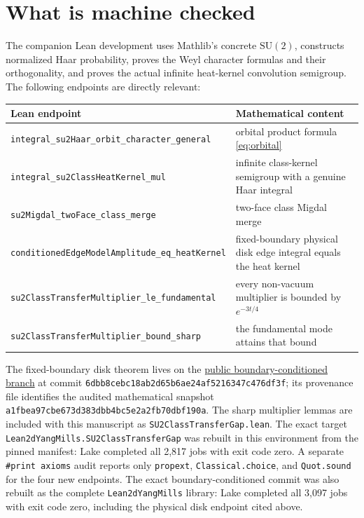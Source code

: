 \documentclass[11pt]{article}
\theoremstyle{remark}
\newcommand{\SU}{\mathrm{SU}(2)}
\begin{document}
\section{What is machine checked}

The companion Lean development uses Mathlib's concrete $\SU$, constructs
normalized Haar probability, proves the Weyl character formulas and their
orthogonality, and proves the actual infinite heat-kernel convolution
semigroup.  The following endpoints are directly relevant:
\begin{center}
\begin{tabular}{>{\raggedright\arraybackslash}p{}
                >{\raggedright\arraybackslash}p{}}
\toprule
Lean endpoint & Mathematical content\\
\midrule
\nolinkurl{integral_su2Haar_orbit_character_general}
  & orbital product formula \eqref{eq:orbital}\\
\nolinkurl{integral_su2ClassHeatKernel_mul}
  & infinite class-kernel semigroup with a genuine Haar integral\\
\nolinkurl{su2Migdal_twoFace_class_merge}
  & two-face class Migdal merge\\
\nolinkurl{conditionedEdgeModelAmplitude_eq_heatKernel}
  & fixed-boundary physical disk edge integral equals the heat kernel\\
\nolinkurl{su2ClassTransferMultiplier_le_fundamental}
  & every non-vacuum multiplier is bounded by $e^{-3t/4}$\\
\nolinkurl{su2ClassTransferMultiplier_bound_sharp}
  & the fundamental mode attains that bound\\
\bottomrule
\end{tabular}
\end{center}

The fixed-boundary disk theorem lives on the
\href{https://github.com/lluiseriksson/lean-2d-yang-mills/tree/agent/su2-boundary-conditioned-bridge}{public boundary-conditioned branch} at commit
\texttt{6dbb8cebc18ab2d65b6ae24af5216347c476df3f}; its provenance file identifies
the audited mathematical snapshot
\texttt{a1fbea97cbe673d383dbb4bc5e2a2fb70dbf190a}.  The sharp multiplier lemmas are
included with this manuscript as \texttt{SU2ClassTransferGap.lean}.
The exact target \texttt{Lean2dYangMills.SU2ClassTransferGap} was rebuilt in
this environment from the pinned manifest: Lake completed all 2,817 jobs with
exit code zero.  A separate \texttt{\#print axioms} audit reports only
\texttt{propext}, \texttt{Classical.choice}, and \texttt{Quot.sound} for the
four new endpoints.  The exact boundary-conditioned commit was also rebuilt as
the complete \texttt{Lean2dYangMills} library: Lake completed all 3,097 jobs
with exit code zero, including the physical disk endpoint cited above.
\end{document}
